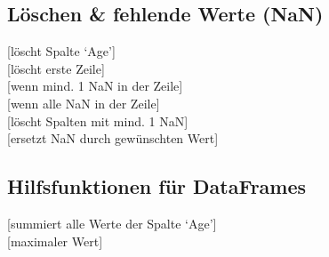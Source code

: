 \subsection{Löschen \& fehlende Werte (NaN)}\label{sec:07-zeilen-und-spalten-loeschen}
\begin{contentbox}
[löscht Spalte `Age']\\
[löscht erste Zeile]\\
\ZSFgapS
{}
[wenn mind. 1 NaN in der Zeile]\\
[wenn alle NaN in der Zeile]\\
\ZSFgapS
{}[löscht Spalten mit mind. 1 NaN]\\
[ersetzt NaN durch gewünschten Wert] %
\end{contentbox}

\subsection{Hilfsfunktionen für DataFrames}\label{sec:07-hilfsfunktionen-fuer-dataframes}
\begin{contentbox}
[summiert alle Werte der Spalte `Age']\\
[maximaler Wert]
\end{contentbox}






